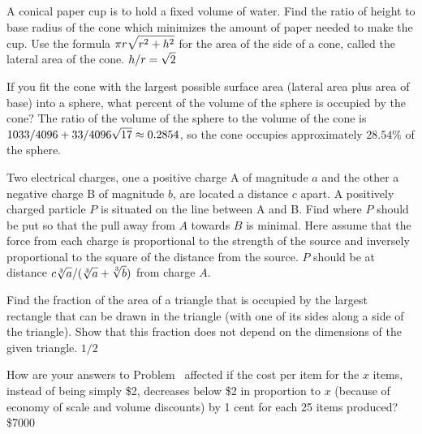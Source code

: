 \exercise A conical paper cup is to hold a fixed volume of water.
Find the ratio of height to base radius of the cone which minimizes
the amount of paper needed to make the cup.  Use the formula $\displaystyle \pi
r\sqrt{r^2+h^2}$ for the area of the side of a cone, called the
{\dfont lateral area\/} of the cone.
\answer $\displaystyle h/r=\sqrt2$
\endanswer

\endexercise

\exercise
If you fit the cone with the largest possible surface area (lateral area
plus area of base) into a sphere, what percent of the volume of the
sphere is occupied by the cone?  
\answer The ratio of the volume of the sphere to the volume of the
cone is $\displaystyle 1033/4096+33/4096\sqrt{17}\approx 0.2854$, so the cone
occupies approximately $28.54\%$ of the sphere.
\endanswer

\endexercise

\exercise
Two electrical charges, one a positive charge A of magnitude $a$ and the
other a negative charge B of magnitude $b$, are located a distance $c$
apart.  A positively charged particle $P$ is situated on the line between A
and B.  Find where $P$ should be put so that the pull away from $A$ towards
$B$ is minimal.  Here assume that the force from each charge is
proportional to the strength of the source and inversely proportional to
the square of the distance from the source.
\answer $P$ should be at distance $\ds c\root 3\of {a} /
(\root 3\of {a} + \root 3\of {b})$ from charge $A$.
\endanswer
\endexercise

\exercise
Find the fraction of the area of a triangle that is occupied by the largest
rectangle that can be drawn in the triangle (with one of its sides along a
side of the triangle).  Show that this fraction does not depend on the
dimensions of the given triangle.
\answer $1/2$
\endanswer
\endexercise

\exercise
How are your answers to Problem~
 affected if the cost per item for the $x$
items, instead of being simply \$2, decreases below \$2 in proportion to
$x$ (because of economy of scale and volume discounts) by 1 cent for each
25 items produced?
\answer \$7000
\endanswer
\endexercise

